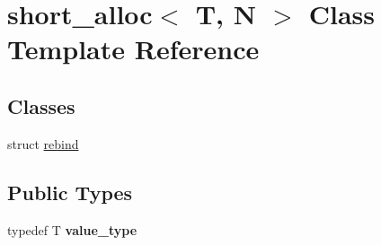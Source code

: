\hypertarget{classshort__alloc}{\section{short\+\_\+alloc$<$ T, N $>$ Class Template Reference}
\label{classshort__alloc}
}
\subsection*{Classes}
\begin{DoxyCompactItemize}
\item 
struct \hyperlink{structshort__alloc_1_1rebind}{rebind}
\end{DoxyCompactItemize}
\subsection*{Public Types}
\begin{DoxyCompactItemize}
\item 
\hypertarget{classshort__alloc_ac3fc764f8712cbeae105d9d0ee760088}{typedef T {\bfseries value\+\_\+type}}\label{classshort__alloc_ac3fc764f8712cbeae105d9d0ee760088}

\end{DoxyCompactItemize}
